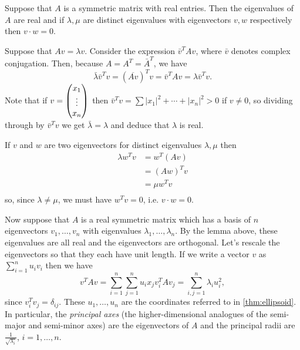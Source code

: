 \documentclass{article}
\begin{document}
\begin{Lemma}
Suppose that \(A\) is a symmetric matrix with real entries. Then the
eigenvalues of \(A\) are real and if \(\lambda,\mu\) are distinct
eigenvalues with eigenvectors \(v,w\) respectively then \(v\cdot
w=0\).
\end{Lemma}
\begin{Proof}
Suppose that \(Av=\lambda v\). Consider the expression
\(\bar{v}^TAv\), where \(\bar{v}\) denotes complex
conjugation. Then, because \(A=A^T=\bar{A}^T\), we have
\[\bar{\lambda}\bar{v}^Tv=(\overline{Av})^{T}v=\bar{v}^TAv=\lambda\bar{v}^Tv.\]
Note that if \(v=\begin{pmatrix} x_1\\ \vdots\\ x_n\end{pmatrix}\) then
\(\bar{v}^Tv=\sum |x_1|^2+\cdots+|x_n|^2>0\) if \(v\neq 0\), so
dividing through by \(\bar{v}^Tv\) we get \(\bar{\lambda}=\lambda\)
and deduce that \(\lambda\) is real.


If \(v\) and \(w\) are two eigenvectors for distinct eigenvalues
\(\lambda,\mu\) then
\begin{align*}
\lambda w^Tv&=w^T(Av)\\
&=(Aw)^Tv\\
&=\mu w^Tv\\
\end{align*}
so, since \(\lambda\neq\mu\), we must have \(w^Tv=0\), i.e. \(v\cdot
w=0\). \qedhere


\end{Proof}
Now suppose that \(A\) is a real symmetric matrix which has a basis of
\(n\) eigenvectors \(v_1,\ldots,v_n\) with eigenvalues
\(\lambda_1,\ldots,\lambda_n\). By the lemma above, these eigenvalues
are all real and the eigenvectors are orthogonal. Let's rescale the
eigenvectors so that they each have unit length. If we write a vector
\(v\) as \(\sum_{i=1}^nu_iv_i\) then we have
\[v^TAv=\sum_{i=1}^n\sum_{j=1}^nu_ix_jv_i^TAv_j=\sum_{i,j=1}^n\lambda_i
u_i^2,\] since \(v_i^Tv_j=\delta_{ij}\). These \(u_1,\ldots,u_n\) are
the coordinates referred to in \cref{thm:ellipsoid}. In particular,
the {\em principal axes} (the higher-dimensional analogues of the
semi-major and semi-minor axes) are the eigenvectors of \(A\) and the
principal radii are \(\frac{1}{\sqrt{\lambda_i}}\), \(i=1,\ldots,n\).
\end{document}
